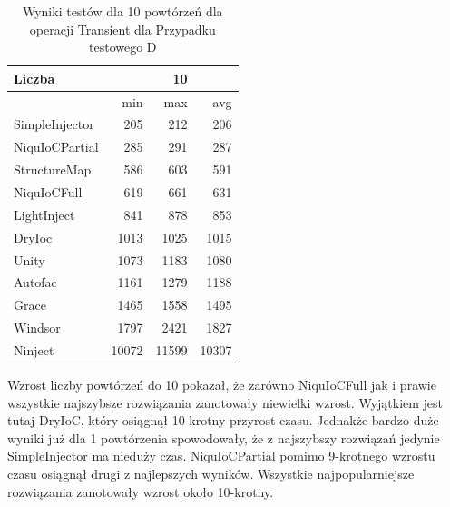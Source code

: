\documentclass[12pt]{article}
\begin{document}
\begin{table}[H]
\captionsetup{belowskip=0pt,aboveskip=0pt}
\begin{center}
\begin{small}
	\begin{tabular}{ | l | r r r | }
    		\hline
Liczba & & 10 & \\ \hline
 & min & max & avg \\ \hline
SimpleInjector & 205 & 212 & 206 \\ \hline
NiquIoCPartial & 285 & 291 & 287 \\ \hline
StructureMap & 586 & 603 & 591 \\ \hline
NiquIoCFull & 619 & 661 & 631 \\ \hline
LightInject & 841 & 878 & 853 \\ \hline
DryIoc & 1013 & 1025 & 1015 \\ \hline
Unity & 1073 & 1183 & 1080 \\ \hline
Autofac & 1161 & 1279 & 1188 \\ \hline
Grace & 1465 & 1558 & 1495 \\ \hline
Windsor & 1797 & 2421 & 1827 \\ \hline
Ninject & 10072 & 11599 & 10307 \\ \hline
  	\end{tabular}
\end{small}
\end{center}
\caption{Wyniki testów dla 10 powtórzeń dla operacji Transient dla Przypadku testowego D}
\label{TestCaseD_Transient10}
\end{table}
Wzrost liczby powtórzeń do 10 pokazał, że zarówno NiquIoCFull jak i prawie wszystkie najszybsze rozwiązania zanotowały niewielki wzrost. Wyjątkiem jest tutaj DryIoC, który osiągnął 10-krotny przyrost czasu. Jednakże bardzo duże wyniki już dla 1 powtórzenia spowodowały, że z najszybszy rozwiązań jedynie SimpleInjector ma nieduży czas. NiquIoCPartial pomimo 9-krotnego wzrostu czasu osiągnął drugi z najlepszych wyników. Wszystkie najpopularniejsze rozwiązania zanotowały wzrost około 10-krotny.
\end{document}
